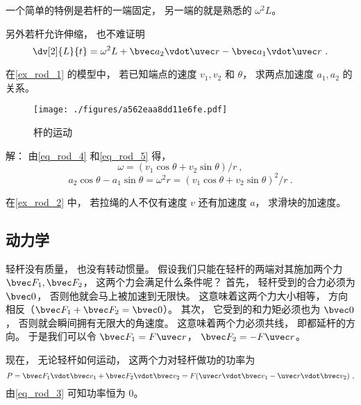 一个简单的特例是若杆的一端固定， 另一端的就是熟悉的 $\omega^2L$。

另外若杆允许伸缩， 也不难证明
\begin{equation}
\dv[2]{L}{t} = \omega^2 L + \bvec a_2 \vdot \uvec r - \bvec a_1 \vdot \uvec r~.
\end{equation}


\begin{example}{}
在\autoref{ex_rod_1} 的模型中， 若已知端点的速度 $v_1, v_2$ 和 $\theta$， 求两点加速度 $a_1, a_2$ 的关系。
\begin{figure}[ht]
\centering
\texttt{[image: ./figures/a562eaa8dd11e6fe.pdf]}
\caption{杆的运动} \label{fig_rod_2}
\end{figure}

解： 由\autoref{eq_rod_4} 和\autoref{eq_rod_5} 得，
\begin{equation}
\omega = (v_1 \cos\theta + v_2 \sin\theta)/r~,
\end{equation}
\begin{equation}
a_2 \cos\theta - a_1 \sin\theta = \omega^2 r = (v_1 \cos\theta + v_2 \sin\theta)^2/r~.
\end{equation}
\end{example}

\begin{exercise}{}
在\autoref{ex_rod_2} 中， 若拉绳的人不仅有速度 $v$ 还有加速度 $a$， 求滑块的加速度。
\end{exercise}

\subsection{动力学}
轻杆没有质量， 也没有转动惯量。 假设我们只能在轻杆的两端对其施加两个力 $\bvec F_1, \bvec F_2$， 这两个力会满足什么条件呢？ 首先， 轻杆受到的合力必须为 $\bvec 0$， 否则他就会马上被加速到无限快。 这意味着这两个力大小相等， 方向相反（$\bvec F_1 + \bvec F_2 = \bvec 0$）。 其次， 它受到的和力矩必须也为 $\bvec 0$， 否则就会瞬间拥有无限大的角速度。 这意味着两个力必须共线， 即都延杆的方向。 于是我们可以令 $\bvec F_1 = F \uvec r$， $\bvec F_2 = -F \uvec r$。

现在， 无论轻杆如何运动， 这两个力对轻杆做功的功率为
\begin{equation}
P = \bvec F_1 \vdot \bvec v_1 + \bvec F_2 \vdot \bvec v_2 = F (\uvec r \vdot \bvec v_1 - \uvec r \vdot \bvec v_2)~,
\end{equation}
由\autoref{eq_rod_3} 可知功率恒为 0。
